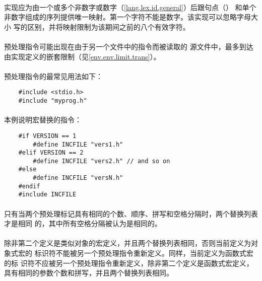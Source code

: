 \paragraph{}
实现应为由一个或多个非数字或数字（\ref{lang.lex.id.general}）后跟句点（）
和单个非数字组成的序列提供唯一映射。第一个字符不能是数字。该实现可以忽略字母大小
写的区别，并将映射限制为该期间之前的八个有效字符。

\paragraph{}
预处理指令可能出现在由于另一个文件中的指令而被读取的
源文件中，最多到达由实现定义的嵌套限制（见\ref{env.env.limit.trans}）。

\paragraph{}
\ex {}预处理指令的最常见用法如下：
\begin{lstlisting}
    #include <stdio.h>
    #include "myprog.h"
\end{lstlisting}

\paragraph{}
\ex 本例说明宏替换的指令：
\begin{lstlisting}
    #if VERSION == 1
        #define INCFILE "vers1.h"
    #elif VERSION == 2
        #define INCFILE "vers2.h" // and so on
    #else
        #define INCFILE "versN.h"
    #endif
    #include INCFILE
\end{lstlisting}


\constraint
\paragraph{}
只有当两个预处理标记具有相同的个数、顺序、拼写和空格分隔时，两个替换列表才是相同
的，其中所有空格分隔被认为是相同的。

\paragraph{}
除非第二个定义是类似对象的宏定义，并且两个替换列表相同，否则当前定义为对象式宏的
标识符不能被另一个预处理指令重新定义。同样，当前定义为函数式宏的标
识符不应被另一个预处理指令重新定义，除非第二个定义是函数式宏定义，
具有相同的参数个数和拼写，并且两个替换列表相同。


